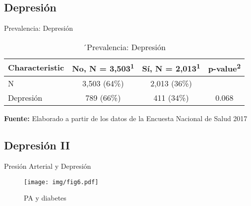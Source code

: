 \documentclass[aspectratio=169]{beamer}
\begin{document}
\subsection*{Depresión}
\begin{frame}{Prevalencia: Depresión}
    \begin{table}[]
\caption{\small ´Prevalencia: Depresión}
    \centering
    \small

    \captionsetup[table]{labelformat=empty,skip=1pt}
\begin{tabular}{lccc}
\toprule
\textbf{Characteristic} & \textbf{No}, N = 3,503\textsuperscript{1} & \textbf{Sí}, N = 2,013\textsuperscript{1} & \textbf{p-value}\textsuperscript{2} \\ 
\midrule
N & 3,503 (64\%) & 2,013 (36\%) &  \\ 
Depresión & 789 (66\%) & 411 (34\%) & 0.068 \\ 
 \bottomrule
\end{tabular}
    \vspace{5mm}
    
    {\raggedright \small \textbf{Fuente:} Elaborado a partir de los datos de la Encuesta Nacional de Salud 2017 \par}
\end{table}
\end{frame}

\subsection*{Depresión II}
\begin{frame}{Presión Arterial y Depresión}
    \begin{figure}
        \centering
        \texttt{[image: img/fig6.pdf]}
        \caption{PA y diabetes}
        \label{fig:my_label}
    \end{figure}
\end{frame}
\end{document}
